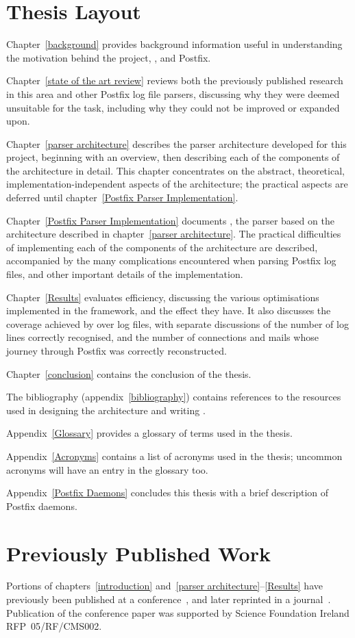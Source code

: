 \section{Thesis Layout}

Chapter~\ref{background} provides background information useful in
understanding the motivation behind the project, , and
Postfix.

Chapter~\ref{state of the art review} reviews both the previously published
research in this area and other Postfix log file parsers, discussing why
they were deemed unsuitable for the task, including why they could not be
improved or expanded upon.

Chapter~\ref{parser architecture} describes the parser architecture
developed for this project, beginning with an overview, then describing
each of the components of the architecture in detail.  This chapter
concentrates on the abstract, theoretical, implementation-independent
aspects of the architecture; the practical aspects are deferred until
chapter~\ref{Postfix Parser Implementation}.

Chapter~\ref{Postfix Parser Implementation} documents \parsername{}, the
parser based on the architecture described in chapter~\ref{parser
architecture}.  The practical difficulties of implementing each of the
components of the architecture are described, accompanied by the many
complications encountered when parsing Postfix log files, and other
important details of the implementation.

Chapter~\ref{Results} evaluates \parsernames{} efficiency, discussing the
various optimisations implemented in the framework, and the effect they
have.  It also discusses the coverage achieved by \parsername{} over
\numberOFlogFILES{} log files, with separate discussions of the number of
log lines correctly recognised, and the number of connections and mails
whose journey through Postfix was correctly reconstructed.

Chapter~\ref{conclusion} contains the conclusion of the thesis.

The bibliography (appendix~\ref{bibliography}) contains references to the
resources used in designing the architecture and writing \parsername{}.

Appendix~\ref{Glossary} provides a glossary of terms used in the thesis.

Appendix~\ref{Acronyms} contains a list of acronyms used in the thesis;
uncommon acronyms will have an entry in the glossary too.

Appendix~\ref{Postfix Daemons} concludes this thesis with a brief
description of Postfix daemons.

\section{Previously Published Work}

Portions of chapters~\ref{introduction} and~\ref{parser
architecture}--\ref{Results} have previously been published at a
conference~\cite{sgai-2008}, and later reprinted in a
journal~\cite{elsevier-2009}.  Publication of the conference paper was
supported by Science Foundation Ireland RFP~05/RF/CMS002.
